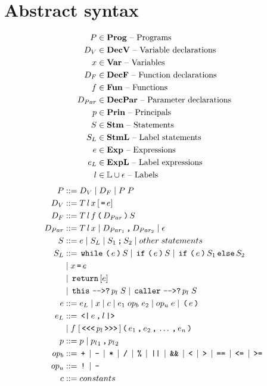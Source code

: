 \section{Abstract syntax}

\begin{align*}
  P       & \in \mathbf{Prog} \text{ -- Programs}\\
  D_V     & \in \mathbf{DecV} \text{ -- Variable declarations}\\
  x       & \in \mathbf{Var} \text{ -- Variables}\\
  D_F     & \in \mathbf{DecF} \text{ -- Function declarations}\\
  f       & \in \mathbf{Fun} \text{ -- Functions}\\
  D_{Par} & \in \mathbf{DecPar} \text{ -- Parameter declarations}\\
  p       & \in \mathbf{Prin} \text{ -- Principals}\\
  S       & \in \mathbf{Stm} \text{ -- Statements}\\
  S_L     & \in \mathbf{StmL} \text{ -- Label statements}\\
  e       & \in \mathbf{Exp} \text{ -- Expressions}\\
  e_L     & \in \mathbf{ExpL} \text{ -- Label expressions}\\
  l       & \in \mathbb{L} \cup \epsilon \text{ -- Labels}\\
\end{align*}
\begin{align*}
  P         & ::= D_V \gp D_F \gp P \; P \\
  D_V       & ::= T \, l \, x \, [\tk = e] \\
  D_F       & ::= T \, l \, f \tk ( D_{Par} \tk ) S \\
  D_{Par}   & ::= T \, l \, x \gp D_{Par_1} \tk , D_{Par_2} \gp \epsilon \\
  S         & ::= e \gp S_L \gp S_1 \tk ; S_2 \gp other \; statements \\
  S_L       & ::= \tk{while} \tk ( e \tk ) S \gp \tk{if} \tk ( e \tk ) S \gp \tk{if} \tk ( e \tk ) S_1 \tk{else} S_2 \\
            & \gp x \tk = e \\
            & \gp \tk{return} [e] \\
            & \gp \tk{this} \tk{-{}->?} p_l \; S \gp \tk{caller} \tk{-{}->?} p_l \; S \\
  e         & ::= e_L \gp x \gp c \gp e_1 \; op_b \; e_2 \gp op_u \; e \gp \tk ( e \tk ) \\
  e_L       & ::= \tk{<|} e \tk , l \tk{|>} \\
            & \gp f \; [\tk{<{}<{}<} p_l \tk{>{}>{}>}] \tk ( e_1 \tk , e_2 \tk , \dots \tk , e_n \tk ) \\
  p         & ::= p \gp {p_l}_1 \tk , {p_l}_2 \\
  op_b      & ::= \tk + \gp \tk - \gp \tk * \gp \tk / \gp \tk \% \gp \tk{||} \gp \tk{\&\&} \gp \tk < \gp \tk > \gp \tk{==} \gp \tk{<=} \gp \tk{>=} \\
  op_u      & ::= \tk ! \gp \tk - \\
  c         & ::= constants
\end{align*}
